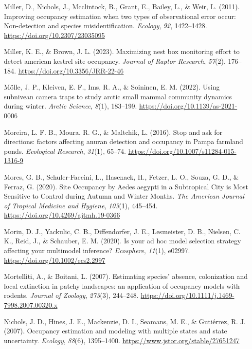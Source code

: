 \documentclass[
]{article}
\newlength{\cslhangindent}
\newenvironment{CSLReferences}[2] %
 {\begin{list}{}{%
  \setlength{\itemindent}{0pt}
  \setlength{\leftmargin}{0pt}
  \setlength{\parsep}{0pt}
  \ifodd #1
   \setlength{\leftmargin}{\cslhangindent}
   \setlength{\itemindent}{-1\cslhangindent}
  \fi
  \setlength{\itemsep}{#2\baselineskip}}}
 {\end{list}}
\begin{document}
\begin{CSLReferences}{1}{0}
Miller, D., Nichols, J., Mcclintock, B., Grant, E., Bailey, L., \& Weir,
L. (2011). Improving occupancy estimation when two types of
observational error occur: Non-detection and species misidentification.
\emph{Ecology}, \emph{92}, 1422--1428.
\url{https://doi.org/10.2307/23035095}

Miller, K. E., \& Brown, J. L. (2023). Maximizing nest box monitoring
effort to detect american kestrel site occupancy. \emph{Journal of
Raptor Research}, \emph{57}(2), 176--184.
\url{https://doi.org/10.3356/JRR-22-46}

Mölle, J. P., Kleiven, E. F., Ims, R. A., \& Soininen, E. M. (2022).
Using subnivean camera traps to study arctic small mammal community
dynamics during winter. \emph{Arctic Science}, \emph{8}(1), 183--199.
\url{https://doi.org/10.1139/as-2021-0006}

Moreira, L. F. B., Moura, R. G., \& Maltchik, L. (2016). Stop and ask
for directions: factors affecting anuran detection and occupancy in
Pampa farmland ponds. \emph{Ecological Research}, \emph{31}(1), 65--74.
\url{https://doi.org/10.1007/s11284-015-1316-9}

Mores, G. B., Schuler-Faccini, L., Hasenack, H., Fetzer, L. O., Souza,
G. D., \& Ferraz, G. (2020). Site Occupancy by Aedes aegypti in a
Subtropical City is Most Sensitive to Control during Autumn and Winter
Months. \emph{The American Journal of Tropical Medicine and Hygiene},
\emph{103}(1), 445--454. \url{https://doi.org/10.4269/ajtmh.19-0366}

Morin, D. J., Yackulic, C. B., Diffendorfer, J. E., Lesmeister, D. B.,
Nielsen, C. K., Reid, J., \& Schauber, E. M. (2020). Is your ad hoc
model selection strategy affecting your multimodel inference?
\emph{Ecosphere}, \emph{11}(1), e02997.
\url{https://doi.org/10.1002/ecs2.2997}

Mortelliti, A., \& Boitani, L. (2007). Estimating species' absence,
colonization and local extinction in patchy landscapes: an application
of occupancy models with rodents. \emph{Journal of Zoology},
\emph{273}(3), 244--248.
\url{https://doi.org/10.1111/j.1469-7998.2007.00320.x}

Nichols, J. D., Hines, J. E., Mackenzie, D. I., Seamans, M. E., \&
Gutiérrez, R. J. (2007). Occupancy estimation and modeling with multiple
states and state uncertainty. \emph{Ecology}, \emph{88}(6), 1395--1400.
\url{https://www.jstor.org/stable/27651247}


\end{CSLReferences}
\end{document}
